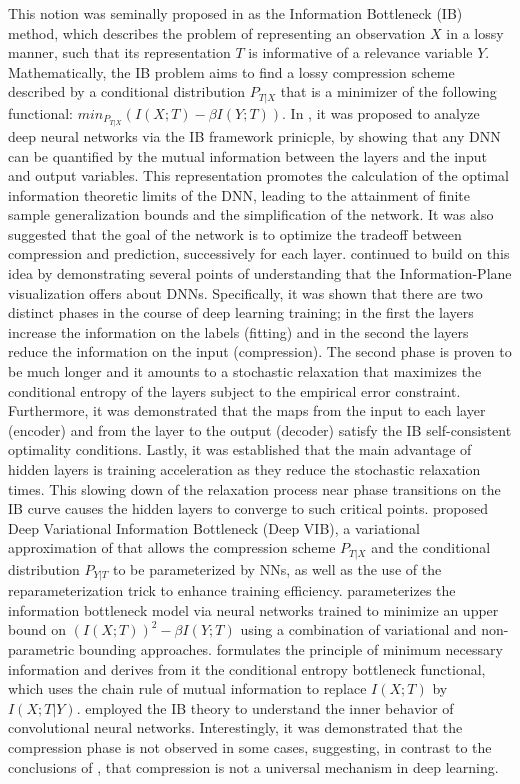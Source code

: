 \documentclass[journal]{IEEEtran}
\begin{document}
This notion was seminally proposed in \cite{Tishby2000} as the Information Bottleneck (IB) method, which describes the problem of representing an observation $X$ in a lossy manner, such that its representation $T$ is informative of a relevance variable $Y$. Mathematically, the IB problem aims to find a lossy compression scheme described by a conditional distribution $P_{T|X}$ that is a minimizer of the following functional: $min_{P_{T|X}}(I(X;T)-\beta I(Y;T))$.
In \cite{Tishby2015}, it was proposed to analyze deep neural networks via the IB framework prinicple, by showing that any DNN can be quantified by the mutual information between the layers and the input and output variables. This representation promotes the calculation of the optimal information theoretic limits of the DNN, leading to the attainment of finite sample generalization bounds and the simplification of the network. It was also suggested that the goal of the network is to optimize the tradeoff between compression and prediction, successively for each layer.
\cite{Shwartz-Ziv2017} continued to build on this idea by demonstrating several points of understanding that the Information-Plane visualization offers about DNNs. Specifically, it was shown that there are two distinct phases in the course of deep learning training; in the first the layers increase the information on the labels (fitting) and in the second the layers reduce the information on the input (compression). The second phase is proven to be much longer and it amounts to a stochastic relaxation that maximizes the conditional entropy of the layers subject to the empirical error constraint. Furthermore, it was demonstrated that the maps from the input to each layer (encoder) and from the layer to the output (decoder) satisfy the IB self-consistent optimality conditions. Lastly, it was established that the main advantage of hidden layers is training acceleration as they reduce the stochastic relaxation times. This slowing down of the relaxation process near phase transitions on the IB curve causes the hidden layers to converge to such critical points.
\cite{Alemi2017} proposed Deep Variational Information Bottleneck (Deep VIB), a variational approximation of \cite{Tishby2000} that allows the compression scheme $P_{T|X}$ and the conditional distribution $P_{Y|T}$ to be parameterized by NNs, as well as the use of the reparameterization trick to enhance training efficiency.
\cite{Kolchinsky2019} parameterizes the information bottleneck model via neural networks trained to minimize an upper bound on $(I(X;T))^2-\beta I(Y;T)$ using a combination of variational and non-parametric bounding approaches. 
\cite{Fischer2020} formulates the principle of minimum necessary information and derives from it the conditional entropy bottleneck functional, which uses the chain rule of mutual information to replace $I(X;T)$ by $I(X;T|Y)$. 
\cite{Li2021} employed the IB theory to understand the inner behavior of convolutional neural networks. Interestingly, it was demonstrated that the compression phase is not observed in some cases, suggesting, in contrast to the conclusions of \cite{Shwartz-Ziv2017}, that compression is not a universal mechanism in deep learning.
\end{document}
